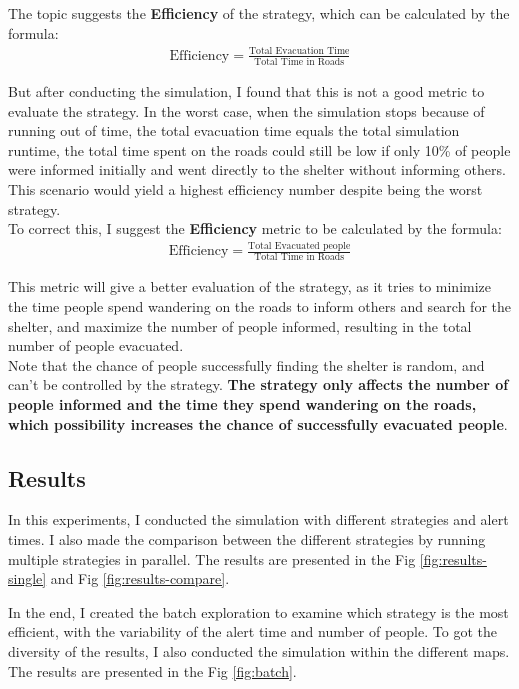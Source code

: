 \documentclass[12pt]{article}
\begin{document}
The topic suggests the \textbf{Efficiency} of the strategy, which can be calculated by the formula:
\begin{align*}
    \text{Efficiency} = \frac{\text{Total Evacuation Time}}{\text{Total Time in Roads}}
\end{align*}

But after conducting the simulation, I found that this is not a good metric to evaluate the strategy. In the worst case, when the simulation stops because of running out of time, the total evacuation time equals the total simulation runtime, the total time spent on the roads could still be low if only 10\% of people were informed initially and went directly to the shelter without informing others. This scenario would yield a highest efficiency number despite being the worst strategy.\\

To correct this, I suggest the \textbf{Efficiency} metric to be calculated by the formula:
\begin{align*}
    \text{Efficiency} = \frac{\text{Total Evacuated people}}{\text{Total Time in Roads}}
\end{align*}

This metric will give a better evaluation of the strategy, as it tries to minimize the time people spend wandering on the roads to inform others and search for the shelter, and maximize the number of people informed, resulting in the total number of people evacuated.\\

Note that the chance of people successfully finding the shelter is random, and can't be controlled by the strategy. \textbf{The strategy only affects the number of people informed and the time they spend wandering on the roads, which possibility increases the chance of successfully evacuated people}.\\

\subsection{Results}

In this experiments, I conducted the simulation with different strategies and alert times. I also made the comparison between the different strategies by running multiple strategies in parallel. The results are presented in the Fig \ref{fig:results-single} and Fig \ref{fig:results-compare}.

In the end, I created the batch exploration to examine which strategy is the most efficient, with the variability of the alert time and number of people. To got the diversity of the results, I also conducted the simulation within the different maps. The results are presented in the Fig \ref{fig:batch}.
\end{document}
